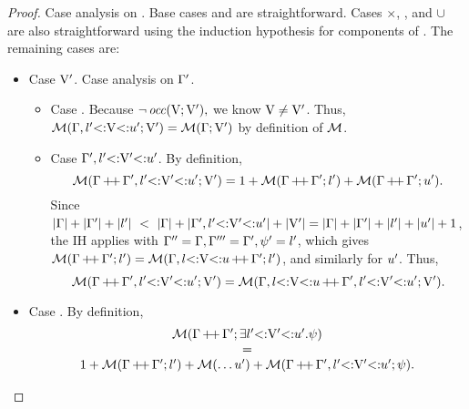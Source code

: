 \begin{proof}
    Case analysis on \tysig. Base cases \tyany and \tybot are straightforward.
    Cases $\times$, \tyinv\iname{\ldots}, and $\cup$ are also straightforward
    using the induction hypothesis for components of \tysig.
    The remaining cases are:
    \begin{itemize}
        \item Case $\mathrm{V}'$. Case analysis on $\Gamma'$.
            \begin{itemize}
                \item Case \EmptyEnv. Because $\lnot \operatorname{\mathit{occ}}(\mathrm{V};\mathrm{V}'),$ we know
                    $\mathrm{V} \neq \mathrm{V}'$. Thus,
                    $\operatorname{\mathcal{M}}(\Gamma, l'{\operatorname{<:}}\mathrm{V}{\operatorname{<:}}u';\mathrm{V}') =
                    \operatorname{\mathcal{M}}(\Gamma;\mathrm{V}')$ by definition of $\operatorname{\mathcal{M}}$.
                \item Case $\Gamma', l'{\operatorname{<:}}\mathrm{V}'{\operatorname{<:}}u'$.
                    By definition,
                    \[\operatorname{\mathcal{M}}(\Gamma\operatorname{+\!+}\Gamma', l'{\operatorname{<:}}\mathrm{V}'{\operatorname{<:}}u';\mathrm{V}') =
                    1 + \operatorname{\mathcal{M}}(\Gamma\operatorname{+\!+}\Gamma';l') + 
                    \operatorname{\mathcal{M}}(\Gamma\operatorname{+\!+}\Gamma';u').\]
                    Since $\size{\AEnv} + \size{\AEnv'} + \size{\tylb'}\ <\ 
                    \size{\AEnv} + \size{\AEnv', \varbound{\vany'}{\tylb'}{\tyub'}} + \size{\vany'} =
                    \size{\AEnv} + \size{\AEnv'} + \size{\tylb'} + \size{\tyub'} + 1$,
                    the IH applies with $\Gamma'' = \Gamma, \Gamma''' = \Gamma', 
                    \psi' = l'$, which gives 
                    $\operatorname{\mathcal{M}}(\Gamma\operatorname{+\!+}\Gamma';l') = 
                    \operatorname{\mathcal{M}}(\Gamma, l{\operatorname{<:}}\mathrm{V}{\operatorname{<:}}u\operatorname{+\!+}\Gamma';l')$,
                    and similarly for $u'$. Thus,
                    \[ \operatorname{\mathcal{M}}(\Gamma\operatorname{+\!+}\Gamma', l'{\operatorname{<:}}\mathrm{V}'{\operatorname{<:}}u';\mathrm{V}') =
                    \operatorname{\mathcal{M}}(\Gamma, l{\operatorname{<:}}\mathrm{V}{\operatorname{<:}}u\operatorname{+\!+}\Gamma', l'{\operatorname{<:}}\mathrm{V}'{\operatorname{<:}}u';\mathrm{V}'). \]
            \end{itemize}
        \item Case .
            By definition,
            \[
                \begin{array}{c}
                    \operatorname{\mathcal{M}}(\Gamma\operatorname{+\!+}\Gamma';\exists l'{\operatorname{<:}}\mathrm{V}'{\operatorname{<:}}u'.\psi) \\
                    = \\
                    1 + \operatorname{\mathcal{M}}(\Gamma\operatorname{+\!+}\Gamma';l') + \operatorname{\mathcal{M}}(\ldots u') +
                    \operatorname{\mathcal{M}}(\Gamma\operatorname{+\!+}\Gamma', l'{\operatorname{<:}}\mathrm{V}'{\operatorname{<:}}u';\psi).

\end{array}\]
\end{itemize}
\end{proof}
